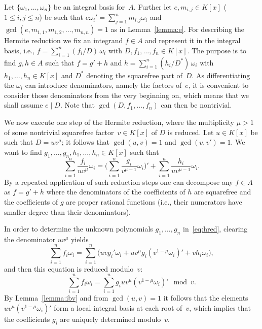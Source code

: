 \documentclass[final,1p,times,authoryear]{elsarticle}
\begin{document}
Let $\{\omega_1,\ldots,\omega_n\}$ be an integral basis for~$A$.
Further let $e,m_{i,j}\in K[x]$ ($1\leq i,j\leq n$) be such that
$e\omega_i'=\sum_{j=1}^n m_{i,j}\omega_i$ and
$\gcd(e,m_{1,1},m_{1,2},\ldots,m_{n,n})=1$ as in Lemma~\ref{lemma:e}. For describing
the Hermite reduction we fix an integrand $f\in A$ and represent it in the
integral basis, i.e., $f=\sum_{i=1}^n (f_i/D)\,\omega_i$ with
$D,f_1,\ldots,f_n\in K[x]$. The purpose is to find $g,h\in A$ such that
$f=g'+h$ and $h=\sum_{i=1}^n(h_i/D^\ast)\,\omega_i$ with $h_1,\ldots,h_n\in K[x]$
and $D^\ast$ denoting the squarefree part of~$D$.
As differentiating the $\omega_i$ can introduce
denominators, name\-ly the factors of~$e$, it is convenient to consider those
denominators from the very beginning on, which means that we shall assume
$e\mid D$. Note that $\gcd(D,f_1,\ldots,f_n)$ can then be nontrivial.

We now execute one step of the Hermite reduction, where the multiplicity
$\mu>1$ of some nontrivial squarefree factor~$v\in K[x]$ of $D$ is reduced.
Let $u\in K[x]$ be such that $D=uv^\mu$; it follows that $\gcd(u,v)=1$ and
$\gcd(v,v')=1$. We want to find $g_1,\ldots,g_n,h_1,\ldots,h_n\in K[x]$
such that
\begin{equation}\label{eq:hred}
  \sum_{i=1}^n \frac{f_i}{uv^\mu}\omega_i =
  \biggl(\sum_{i=1}^n\frac{g_i}{v^{\mu-1}}\omega_i\biggr)' +
  \sum_{i=1}^n \frac{h_i}{uv^{\mu-1}}\omega_i.
\end{equation}
By a repeated application of such reduction steps one can decompose any $f\in A$
as $f=g'+h$ where the denominators of the coefficients of $h$ are squarefree
and the coefficients of $g$ are proper rational functions (i.e., their numerators
have smaller degree than their denominators).

In order to determine the unknown polynomials $g_1,\ldots,g_n$ in~\eqref{eq:hred},
clearing the denominator $uv^\mu$ yields
\begin{equation}\label{eq:clear}
  \sum_{i=1}^n f_i\omega_i = \sum_{i=1}^n \biggl( uvg_i'\omega_i +
  uv^\mu g_i\left(v^{1-\mu}\omega_i\right)' + vh_i\omega_i \biggr),
\end{equation}
and then this equation is reduced modulo~$v$:
\begin{equation}\label{eq:modv}
  \sum_{i=1}^n f_i\omega_i =
  \sum_{i=1}^n g_iuv^\mu\left(v^{1-\mu}\omega_i\right)' \mod v.
\end{equation}
By Lemma~\ref{lemma:ibv} and from $\gcd(u,v)=1$ it follows that
the elements $uv^\mu\left(v^{1-\mu}\omega_i\right)'$ form a local integral basis
at each root of~$v$, which implies that the coefficients $g_i$ are
uniquely determined modulo~$v$.
\end{document}
